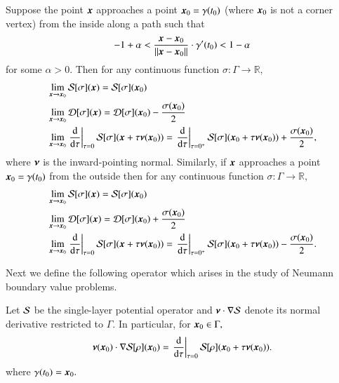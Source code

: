 \begin{theorem}\label{thm:potlim}
Suppose the point $\boldsymbol{x}$ approaches a point $\boldsymbol{x}_0 = \gamma(t_0)$ (where $\boldsymbol{x}_{0}$ is not a corner vertex) from the inside along a path such that 
\begin{align}
-1+\alpha<\frac{\boldsymbol{x}-\boldsymbol{x}_0}{\|\boldsymbol{x}-\boldsymbol{x}_0\|} \cdot \gamma'(t_0) <1-\alpha
\end{align}
for some $\alpha >0.$ Then for any continuous function $\sigma:\Gamma \to \mathbb{R},$
{\color{olive}
\begin{align}
&\lim_{\boldsymbol{x} \to \boldsymbol{x}_0} \mathcal{S}[\sigma](\boldsymbol{x}) = \mathcal{S}[\sigma](\boldsymbol{x}_0)\\
&\lim_{\boldsymbol{x} \to \boldsymbol{x}_0} \mathcal{D}[\sigma](\boldsymbol{x}) = \mathcal{D}[\sigma](\boldsymbol{x}_0)- \frac{\sigma(\boldsymbol{x}_0)}{2}\\
&\lim_{\boldsymbol{x} \to \boldsymbol{x}_0} \left.\frac{{\rm d}}{{\rm d}\tau}\right|_{\tau= 0}\mathcal{S}[\sigma](\boldsymbol{x}+\tau \boldsymbol{\nu}(\boldsymbol{x}_0)) = \left.\frac{{\rm d}}{{\rm d}\tau}\right|_{\tau= 0^+}\mathcal{S}[\sigma](\boldsymbol{x}_0+\tau \boldsymbol{\nu}(\boldsymbol{x}_0))+ \frac{\sigma(\boldsymbol{x}_0)}{2},
\end{align}
where $\boldsymbol{\nu}$ is the inward-pointing normal.} Similarly, if $\boldsymbol{x}$ approaches a point $\boldsymbol{x}_0 = \gamma(t_0)$ from the outside then for any continuous function $\sigma:\Gamma \to \mathbb{R},$
{\color{olive}
\begin{align}
&\lim_{\boldsymbol{x} \to \boldsymbol{x}_0} \mathcal{S}[\sigma](\boldsymbol{x}) = \mathcal{S}[\sigma](\boldsymbol{x}_0)\\
&\lim_{\boldsymbol{x} \to \boldsymbol{x}_0} \mathcal{D}[\sigma](\boldsymbol{x}) = \mathcal{D}[\sigma](\boldsymbol{x}_0)+ \frac{\sigma(\boldsymbol{x}_0)}{2}\\
&\lim_{\boldsymbol{x} \to \boldsymbol{x}_0} \left.\frac{{\rm d}}{{\rm d}\tau}\right|_{\tau= 0}\mathcal{S}[\sigma](\boldsymbol{x}+\tau \boldsymbol{\nu}(\boldsymbol{x}_0)) = \left.\frac{{\rm d}}{{\rm d}\tau}\right|_{\tau= 0^+}\mathcal{S}[\sigma](\boldsymbol{x}_0+\tau \boldsymbol{\nu}(\boldsymbol{x}_0))- \frac{\sigma(\boldsymbol{x}_0)}{2}.
\end{align}}
\end{theorem}

Next we define the following operator which arises in the study of Neumann boundary value problems.
\begin{definition}\label{def_singder}
Let $\mathcal{S}$ be the single-layer potential operator and $\boldsymbol{\nu}\cdot \nabla \mathcal{S}$  denote its normal derivative restricted to $\Gamma.$ In particular, for $\boldsymbol{x}_0 \in \Gamma,$
\begin{align}
\boldsymbol{\nu}(\boldsymbol{x}_0)\cdot \nabla \mathcal{S}[\rho] (\boldsymbol{x}_0) = \left.\frac{{\rm d}}{{\rm d}\tau}\right|_{\tau = 0} \mathcal{S}[\rho](\boldsymbol{x}_0 + \tau \boldsymbol{\nu}(\boldsymbol{x}_0)).
\end{align}
{\color{red}where $\gamma(t_0) = \boldsymbol{x}_0.$}
\end{definition}

